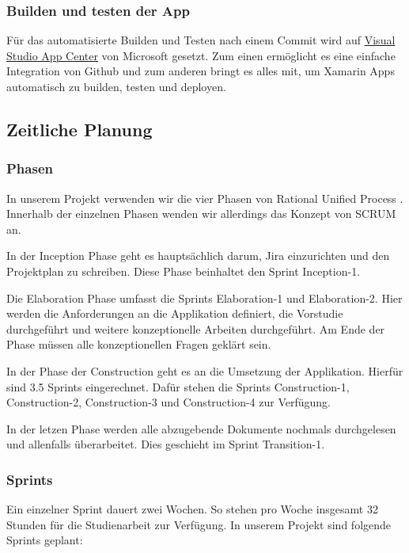 \subsubsection*{Builden und testen der App}
Für das automatisierte Builden und Testen nach einem Commit wird auf \href{https://appcenter.ms/orgs/BrainingOutOfBox/apps/BrainingOutOfBox-App}{Visual Studio App Center} von Microsoft gesetzt. Zum einen ermöglicht es eine einfache Integration von Github und zum anderen bringt es alles mit, um Xamarin Apps automatisch zu builden, testen und deployen. 

\subsection{Zeitliche Planung}

\subsubsection*{Phasen}
In unserem Projekt verwenden wir die vier Phasen von Rational Unified Process \cite{RUP}. Innerhalb der einzelnen Phasen wenden wir allerdings das Konzept von SCRUM \cite{SCRUM} an.  
\begin{description}[leftmargin=!,labelwidth=\widthof{\bfseries Construction Phase}]
	\item [Inception Phase] In der Inception Phase geht es hauptsächlich darum, Jira einzurichten und den Projektplan zu schreiben. Diese Phase beinhaltet den Sprint Inception-1.
	\item [Elaboration Phase] Die Elaboration Phase umfasst die Sprints Elaboration-1 und Elaboration-2. Hier werden die Anforderungen an die Applikation definiert, die Vorstudie durchgeführt und weitere konzeptionelle Arbeiten durchgeführt. Am Ende der Phase müssen alle konzeptionellen Fragen geklärt sein. 
	\item [Construction Phase] In der Phase der Construction geht es an die Umsetzung der Applikation. Hierfür sind 3.5 Sprints eingerechnet. Dafür stehen die Sprints Construction-1, Construction-2, Construction-3 und Construction-4 zur Verfügung.
	\item [Transition Phase] In der letzen Phase werden alle abzugebende Dokumente nochmals durchgelesen und allenfalls überarbeitet. Dies geschieht im Sprint Transition-1.
\end{description}

\subsubsection*{Sprints}
Ein einzelner Sprint dauert zwei Wochen. So stehen pro Woche insgesamt 32 Stunden für die Studienarbeit zur Verfügung. In unserem Projekt sind folgende Sprints geplant:

